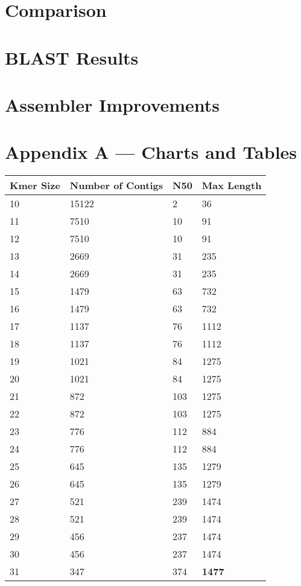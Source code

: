 \documentclass[12pt]{article}
\begin{document}
\section{Comparison}

\section{BLAST Results}

\section{Assembler Improvements}

\section*{Appendix A --- Charts and Tables}
\begin{table}
\begin{tabular}{|l|l|l|l|}
\hline
Kmer Size &Number of Contigs &N50 &Max Length\\\hline
10 &15122 &2 &36 \\
11 &7510 &10 &91 \\
12 &7510 &10 &91 \\
13 &2669 &31 &235 \\
14 &2669 &31 &235 \\
15 &1479 &63 &732 \\
16 &1479 &63 &732 \\
17 &1137 &76 &1112 \\
18 &1137 &76 &1112 \\
19 &1021 &84 &1275 \\
20 &1021 &84 &1275 \\
21 &872 &103 &1275 \\
22 &872 &103 &1275 \\
23 &776 &112 &884 \\
24 &776 &112 &884 \\
25 &645 &135 &1279 \\
26 &645 &135 &1279 \\
27 &521 &239 &1474 \\
28 &521 &239 &1474 \\
29 &456 &237 &1474 \\
30 &456 &237 &1474 \\
31 &347 &374 &\textbf{1477}\\\hline
\end{tabular}
\end{table}
\end{document}
